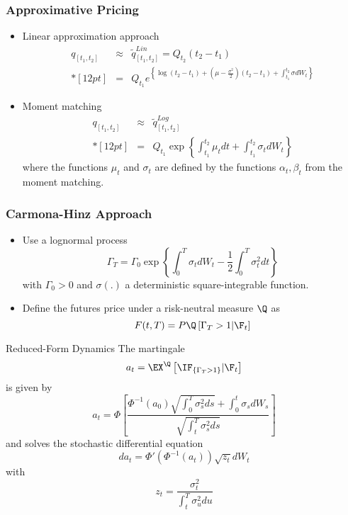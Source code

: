 \begin{frame}
\frametitle{Approximative Pricing}
\begin{itemize}
\item<1-> Linear approximation approach
$$
\begin{array}{lll}
q_{[t_1,t_2]} &\approx& \tilde{q}^{Lin}_{[t_1,t_2]} = Q_{t_2} (t_2 - t_1) \\*[12pt]
&=&\displaystyle   Q_{t_1} e^{\left\{\log (t_2 - t_1) + \left(\mu-\frac{\sigma^2}{2}\right)(t_2-t_1)+\int_{t_1}^{t_2}\sigma dW_t\right\}}
\end{array}
$$
\item<2-> Moment matching
$$
\begin{array}{lll}
q_{[t_1,t_2]} &\approx& \tilde{q}^{Log}_{[t_1,t_2]}\\*[12pt]
&=& Q_{t_1} \exp\left\{ \int_{t_1}^{t_2}\mu_t dt + \int_{t_1}^{t_2} \sigma_t dW_t\right\}
\end{array}
$$
where the functions $\mu_t$ and $\sigma_t$ are defined by the functions $\alpha_t, \beta_t$ from the moment matching.
\end{itemize}
\end{frame}

\begin{frame}
\frametitle{Carmona-Hinz Approach}
\begin{itemize}
\item<1-> Use a lognormal process
$$
\Gamma_{T}= \Gamma_0  \exp{\left\{\int_{0}^{T}\sigma_t dW_t -\frac{1}{2}\int_0^T \sigma^2_t dt\right\}}
$$
with $\Gamma_0 >0$ and $\sigma(.)$ a deterministic square-integrable function.
\item<2-> Define the futures price under a risk-neutral measure $\Q$ as
$$
F(t,T) = P \Q\left[\Gamma_T>1 |\F_t\right]
$$
\end{itemize}
\end{frame}


{Reduced-Form Dynamics}
The martingale
$$
a_t = \EX^\Q\left[\IF_{\{\Gamma_T>1\}} |\F_t\right]
$$
is given by
$$
a_t= \Phi \left[\frac{\Phi^{-1}(a_0) \sqrt{\int_0^T \sigma^2_s ds}+\int_0^t \sigma_s dW_s}{\sqrt{\int_t^T \sigma^2_s ds}}\right]
$$
and solves the stochastic differential equation
$$
da_t = \Phi'\left(\Phi^{-1}(a_t)\right)\sqrt{z_t}dW_t
$$
with
$$
z_t=\frac{\sigma_t^2}{\int_t^T \sigma^2_u du}
$$


